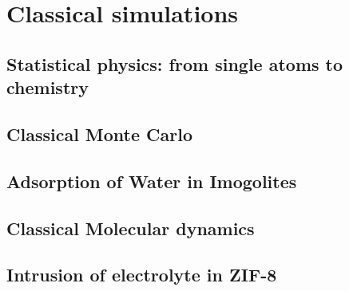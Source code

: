 \documentclass[thesis]{subfiles}
\begin{document}
\chapter{Classical simulations}
\startcontents[chapters]
\printpartialtoc

\section{Statistical physics: from single atoms to chemistry}

\section{Classical Monte Carlo}

\section{Adsorption of Water in Imogolites}

\section{Classical Molecular dynamics}

\section{Intrusion of electrolyte in ZIF-8}
\end{document}
